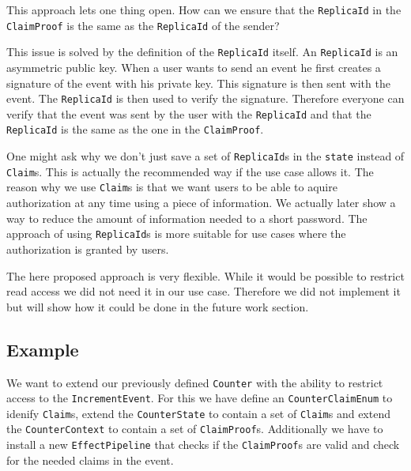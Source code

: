 \documentclass[
	ngerman,
	ruledheaders=section,   %
	class=report,		    %
	thesis={type=bachelor}, %
	accentcolor=9c,			%
	custommargins=false,    %
	marginpar=false,        %
	parskip=half-,          %
	fontsize=11pt,          %
]{tudapub}
\let\code\texttt
\begin{document}

This approach lets one thing open. How can we ensure that the \code{ReplicaId} in the \code{ClaimProof} is the same as the \code{ReplicaId} of the sender?

This issue is solved by the definition of the \code{ReplicaId} itself. An \code{ReplicaId} is an asymmetric public key. When a user wants to send an event he first creates a signature of the event with his private key. This signature is then sent with the event. The \code{ReplicaId} is then used to verify the signature. Therefore everyone can verify that the event was sent by the user with the \code{ReplicaId} and that the \code{ReplicaId} is the same as the one in the \code{ClaimProof}.

One might ask why we don't just save a set of \code{ReplicaId}s in the \code{state} instead of \code{Claim}s. This is actually the recommended way if the use case allows it. The reason why we use \code{Claim}s is that we want users to be able to aquire authorization at any time using a piece of information. We actually later show a way to reduce the amount of information needed to a short password. The approach of using \code{ReplicaId}s is more suitable for use cases where the authorization is granted by users.


The here proposed approach is very flexible. While it would be possible to restrict read access we did not need it in our use case. Therefore we did not implement it but will show how it could be done in the future work section.

\newpage

\subsection{Example}

We want to extend our previously defined \code{Counter} with the ability to restrict access to the \code{IncrementEvent}. For this we have define an \code{CounterClaimEnum} to idenify \code{Claim}s, extend the \code{CounterState} to contain a set of \code{Claim}s and extend the \code{CounterContext} to contain a set of \code{ClaimProof}s. Additionally we have to install a new \code{EffectPipeline} that checks if the \code{ClaimProof}s are valid and check for the needed claims in the event.
\end{document}
